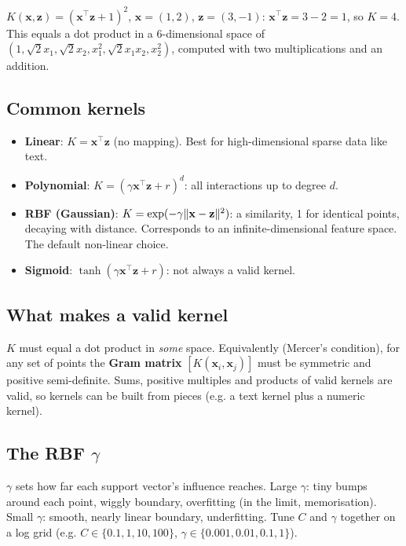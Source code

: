 \begin{example}
$K(\mathbf x,\mathbf z) = (\mathbf x^\top\mathbf z + 1)^2$, $\mathbf x = (1,2)$, $\mathbf z = (3,-1)$: $\mathbf x^\top\mathbf z = 3 - 2 = 1$, so $K = 4$.
This equals a dot product in a 6-dimensional space of $(1, \sqrt2x_1, \sqrt2x_2, x_1^2, \sqrt2x_1x_2, x_2^2)$, computed with two
multiplications and an addition.
\end{example}

\subsection{Common kernels}
\begin{itemize}
\item \textbf{Linear}: $K = \mathbf x^\top\mathbf z$ (no mapping). Best for high-dimensional sparse data like text.
\item \textbf{Polynomial}: $K = (\gamma\mathbf x^\top\mathbf z + r)^d$: all interactions up to degree $d$.
\item \textbf{RBF (Gaussian)}: $K = \exp(-\gamma\lVert \mathbf x - \mathbf z\rVert^2)$: a similarity, 1 for identical points, decaying with
  distance. Corresponds to an infinite-dimensional feature space. The default non-linear choice.
\item \textbf{Sigmoid}: $\tanh(\gamma\mathbf x^\top\mathbf z + r)$: not always a valid kernel.
\end{itemize}

\subsection{What makes a valid kernel}
$K$ must equal a dot product in \emph{some} space. Equivalently (Mercer's condition), for any set of points the \textbf{Gram matrix}
$[K(\mathbf x_i,\mathbf x_j)]$ must be symmetric and positive semi-definite. Sums, positive multiples and products of valid kernels are
valid, so kernels can be built from pieces (e.g. a text kernel plus a numeric kernel).

\subsection{The RBF $\gamma$}
$\gamma$ sets how far each support vector's influence reaches. Large $\gamma$: tiny bumps around each point, wiggly boundary,
overfitting (in the limit, memorisation). Small $\gamma$: smooth, nearly linear boundary, underfitting. Tune $C$ and $\gamma$ together
on a log grid (e.g. $C\in\{0.1, 1, 10, 100\}$, $\gamma\in\{0.001, 0.01, 0.1, 1\}$).

